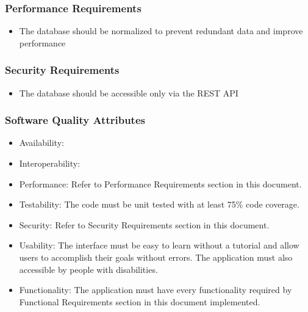 \documentclass[a4paper]{article}
\begin{document}
    \subsubsection{Performance Requirements}
    \begin{itemize}
        \item The database should be normalized to prevent redundant data and improve performance
    \end{itemize}

    \subsubsection{Security Requirements}
    \begin{itemize}
        \item The database should be accessible only via the REST API
    \end{itemize}

    \subsubsection{Software Quality Attributes}
    \begin{itemize}
        \item Availability: %
        \item Interoperability: %
        \item Performance: Refer to Performance Requirements section in this document.
        \item Testability: The code must be unit tested with at least 75\% code coverage.
        \item Security: Refer to Security Requirements section in this document.
        \item Usability: The interface must be easy to learn without a tutorial and allow users to accomplish their goals without errors. The application must also accessible by people with disabilities.
        \item Functionality: The application must have every functionality required by Functional Requirements section in this document implemented.
    \end{itemize}
\end{document}

